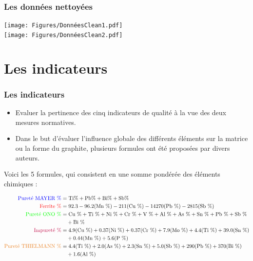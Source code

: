 \documentclass[aspectratio=169]{beamer}
\begin{document}
\begin{frame}
\frametitle{Les données nettoyées}
    \texttt{[image: Figures/DonnéesClean1.pdf]} \\
    \vspace{20pt}
    \texttt{[image: Figures/DonnéesClean2.pdf]} 
\end{frame}

\section{Les indicateurs}



\begin{frame}
\frametitle{Les indicateurs}
\small
\begin{itemize}
  \item  Evaluer la pertinence des cinq indicateurs de qualité à la vue des deux mesures normatives.
  \item Dans le but d'évaluer l'influence globale des différents éléments sur la matrice ou la forme du graphite, plusieurs formules ont été proposées par divers auteurs.
\end{itemize}

Voici les 5 formules, qui consistent en une somme pondérée des éléments chimiques :

\footnotesize
\begin{align*}
\textcolor{blue}{\text{Pureté MAYER \%}} &= \text{Ti\%} + \text{Pb\%} + \text{Bi\%} + \text{Sb\%} \\
\textcolor{red}{\text{Ferrite \%}} &= 92.3 - 96.2 (\text{Mn \%}) - 211 (\text{Cu \%}) - 14270 (\text{Pb \%}) - 2815 (\text{Sb \%}) \\
\textcolor{green}{\text{Pureté ONO \%}} &= \text{Cu \%} + \text{Ti \%} + \text{Ni \%} + \text{Cr \%} + \text{V \%} + \text{Al \%} + \text{As \%}  + \text{Sn \%} + \text{Pb \%} + \text{Sb \%} \\
&\quad + \text{Bi \%} \\
\textcolor{purple}{\text{Impureté \%}} &= 4.9 (\text{Cu \%}) + 0.37 (\text{Ni \%}) + 0.37 (\text{Cr \%})  + 7.9 (\text{Mo \%}) + 4.4 (\text{Ti \%}) + 39.0 (\text{Sn \%}) \\ 
&\quad + 0.44 (\text{Mn \%}) + 5.6 (\text{P \%}) \\
\textcolor{orange}{\text{Pureté THIELMANN \%}} &= 4.4 (\text{Ti \%}) + 2.0 (\text{As \%}) + 2.3 (\text{Sn \%}) + 5.0 (\text{Sb \%}) + 290 (\text{Pb \%}) + 370 (\text{Bi \%}) \\
&\quad + 1.6 (\text{Al \%})
\end{align*}
\end{frame}
\end{document}

